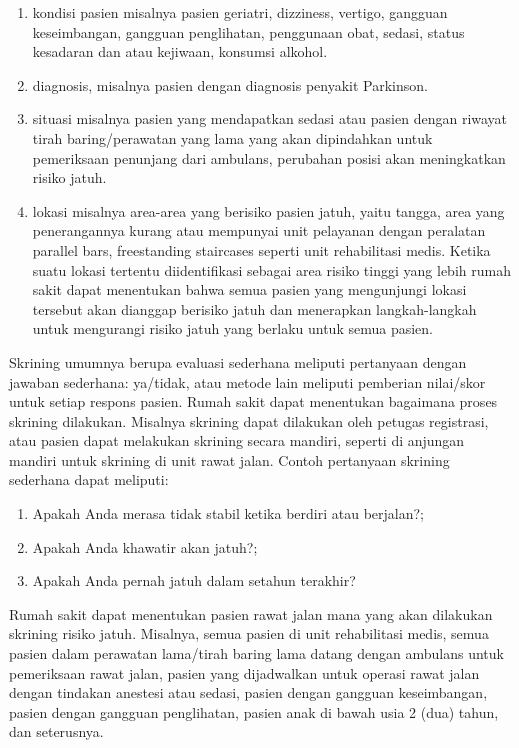 \documentclass[
]{book}
\providecommand{\tightlist}{%
  \setlength{\itemsep}{0pt}\setlength{\parskip}{0pt}}
\begin{document}
\begin{enumerate}
\def\labelenumi{\arabic{enumi}.}
\tightlist
\item
  kondisi pasien misalnya pasien geriatri, dizziness, vertigo, gangguan keseimbangan, gangguan penglihatan, penggunaan obat, sedasi, status kesadaran dan atau kejiwaan, konsumsi alkohol.
\item
  diagnosis, misalnya pasien dengan diagnosis penyakit Parkinson.
\item
  situasi misalnya pasien yang mendapatkan sedasi atau pasien dengan riwayat tirah baring/perawatan yang lama yang akan dipindahkan untuk pemeriksaan penunjang dari ambulans, perubahan posisi akan meningkatkan risiko jatuh.
\item
  lokasi misalnya area-area yang berisiko pasien jatuh, yaitu tangga, area yang penerangannya kurang atau mempunyai unit pelayanan dengan peralatan parallel bars, freestanding staircases seperti unit rehabilitasi medis. Ketika suatu lokasi tertentu diidentifikasi sebagai area risiko tinggi yang lebih rumah sakit dapat menentukan bahwa semua pasien yang mengunjungi lokasi tersebut akan dianggap berisiko jatuh dan menerapkan langkah-langkah untuk mengurangi risiko jatuh yang berlaku untuk semua pasien.
\end{enumerate}

Skrining umumnya berupa evaluasi sederhana meliputi pertanyaan dengan jawaban sederhana: ya/tidak, atau metode lain meliputi pemberian nilai/skor untuk setiap respons pasien. Rumah sakit dapat menentukan bagaimana proses skrining dilakukan. Misalnya skrining dapat dilakukan oleh petugas registrasi, atau pasien dapat melakukan skrining secara mandiri, seperti di anjungan mandiri untuk skrining di unit rawat jalan.
Contoh pertanyaan skrining sederhana dapat meliputi:

\begin{enumerate}
\def\labelenumi{\arabic{enumi}.}
\tightlist
\item
  Apakah Anda merasa tidak stabil ketika berdiri atau berjalan?;
\item
  Apakah Anda khawatir akan jatuh?;
\item
  Apakah Anda pernah jatuh dalam setahun terakhir?
\end{enumerate}

Rumah sakit dapat menentukan pasien rawat jalan mana yang akan dilakukan skrining risiko jatuh. Misalnya, semua pasien di unit rehabilitasi medis, semua pasien dalam perawatan lama/tirah baring lama datang dengan ambulans untuk pemeriksaan rawat jalan, pasien yang dijadwalkan untuk operasi rawat jalan dengan tindakan anestesi atau sedasi, pasien dengan gangguan keseimbangan, pasien dengan gangguan penglihatan, pasien anak di bawah usia 2 (dua) tahun, dan seterusnya.
\end{document}
